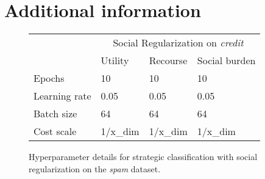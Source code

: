 \section{Additional information}
\begin{figure}[H]
    \centering
    \begin{tabular}{l|lll|}
    \cline{2-4}
                                        & \multicolumn{3}{c|}{Social Regularization on \textit{credit}}                            \\ \cline{2-4} 
                                        & \multicolumn{1}{l|}{Utility}  & \multicolumn{1}{l|}{Recourse} & Social burden \\ \hline
    \multicolumn{1}{|l|}{Epochs}        & \multicolumn{1}{l|}{10}       & \multicolumn{1}{l|}{10}       & 10            \\ \hline
    \multicolumn{1}{|l|}{Learning rate} & \multicolumn{1}{l|}{0.05}     & \multicolumn{1}{l|}{0.05}     & 0.05          \\ \hline
    \multicolumn{1}{|l|}{Batch size}    & \multicolumn{1}{l|}{64}       & \multicolumn{1}{l|}{64}       & 64            \\ \hline
    \multicolumn{1}{|l|}{Cost scale}         & \multicolumn{1}{l|}{1/x\_dim} & \multicolumn{1}{l|}{1/x\_dim} & 1/x\_dim      \\ \hline
\end{tabular}
    \caption{Hyperparameter details for strategic classification with social regularization on the \textit{spam} dataset.}
    \label{tab:hyperparams_reg}
\end{figure}





